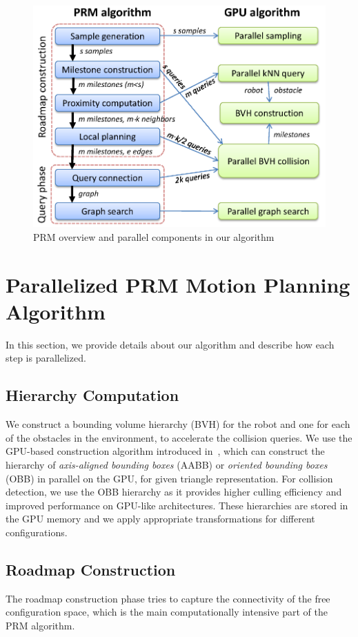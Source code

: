 \begin{figure}[!htb]
  \centering
  \includegraphics[width=0.9\linewidth]{figs/4/algorithm_overview.pdf}
  \caption[An overview of serial PRM and the GPU-based planner]{PRM overview and parallel components in our algorithm}
  \label{fig:4:GPU}
\end{figure}


\section{Parallelized PRM Motion Planning Algorithm}
\label{sec:4:algorithm}
In this section, we provide details about our algorithm and describe how each step is parallelized.

\subsection{Hierarchy Computation}
We construct a bounding volume hierarchy (BVH) for the robot and one for each of the obstacles in the environment, to accelerate the collision queries. We use the GPU-based construction algorithm introduced in~\cite{LauterbachGSLM09}, which can construct the hierarchy of \emph{axis-aligned bounding boxes} (AABB) or \emph{oriented bounding boxes} (OBB) in parallel on the GPU, for given triangle representation. For collision detection, we use the OBB hierarchy as it provides higher culling
efficiency and improved performance on GPU-like architectures. These hierarchies are stored in the GPU memory and we apply appropriate transformations for different configurations.

\subsection{Roadmap Construction}
The roadmap construction phase tries to capture the connectivity of the free configuration space, which is the main computationally intensive part of the PRM algorithm.

